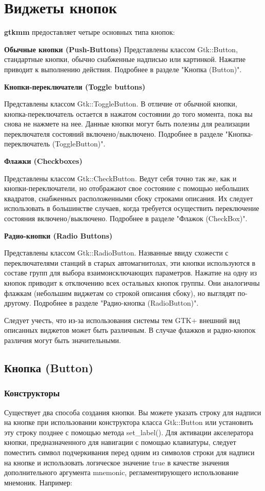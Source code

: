\chapter{Виджеты кнопок}
{\bfseries gtkmm} предоставляет четыре основных типа кнопок: 


{\bfseries Обычные кнопки (Push-Buttons) }
Представлены классом Gtk::Button, стандартные кнопки, обычно снабженные надписью или картинкой. Нажатие приводит к выполнению действия. Подробнее в разделе "Кнопка (Button)". 

{\bfseries Кнопки-переключатели (Toggle buttons) }

Представлены классом Gtk::ToggleButton. В отличие от обычной кнопки, кнопка-переключатель остается в нажатом состоянии до того момента, пока вы снова не нажмете на нее. Данные кнопки могут быть полезны для реализации переключателя состояний включено/выключено. Подробнее в разделе "Кнопка-переключатель (ToggleButton)". 

{\bfseries Флажки (Checkboxes)}

Представлены классом Gtk::CheckButton. Ведут себя точно так же, как и кнопки-переключатели, но отображают свое состояние с помощью небольших квадратов, снабженных расположенными сбоку строками описания. Их следует использовать в большинстве случаев, когда требуется осуществить переключение состояния включено/выключено. Подробнее в разделе "Флажок (CheckBox)". 

{\bfseries Радио-кнопки (Radio Buttons)}

Представлены классом Gtk::RadioButton. Названные ввиду схожести с переключателями станций в старых автомагнитолах, эти кнопки используются в составе групп для выбора взаимоисключающих параметров. Нажатие на одну из кнопок приводит к отключению всех остальных кнопок группы. Они аналогичны флажкам (небольшим виджетам со строкой описания сбоку), но выглядят по-другому. Подробнее в разделе "Радио-кнопка (RadioButton)". 

Следует учесть, что из-за использования системы тем GTK+ внешний вид описанных виджетов может быть различным. В случае флажков и радио-кнопок различия могут быть значительными. 

\section{Кнопка (Button)}
\subsection{Конструкторы}
 Существует два способа создания кнопки. Вы можете указать строку для надписи на кнопке при использовании конструктора класса Gtk::Button или установить эту строку позднее с помощью метода set\_label().
Для активации акселератора кнопки, предназначенного для навигации с помощью клавиатуры, следует поместить символ подчеркивания перед одним из символов строки для надписи на кнопке и использовать логическое значение true в качестве значения дополнительного аргумента mnemonic, регламентирующего использование мнемоник. Например:

